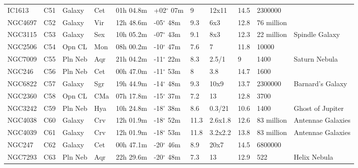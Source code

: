 \documentclass[10pt,twoside,a4paper,english]{article}
\begin{document}
\begin{longtable}{@{}lllllllllll@{}}
IC1613     & C51           & Galaxy  & Cet & 01h 04.8m & +02$^{\circ}$ 07m & 9    & 12x11          & 14.5 & 2300000       &                                 \\ 
NGC4697    & C52           & Galaxy  & Vir & 12h 48.6m & -05$^{\circ}$ 48m & 9.3  & 6x3            & 12.8 & 76 million    &                                 \\ 
NGC3115    & C53           & Galaxy  & Sex & 10h 05.2m & -07$^{\circ}$ 43m & 9.1  & 8x3            & 12.3 & 22 million    & Spindle Galaxy                  \\ 
NGC2506    & C54           & Opn CL  & Mon & 08h 00.2m & -10$^{\circ}$ 47m & 7.6  & 7              & 11.8 & 10000         &                                 \\ 
NGC7009    & C55           & Pln Neb & Aqr & 21h 04.2m & -11$^{\circ}$ 22m & 8.3  & 2.5/1          & 9    & 1400          & Saturn Nebula                   \\ 
NGC246     & C56           & Pln Neb & Cet & 00h 47.0m & -11$^{\circ}$ 53m & 8    & 3.8            & 14.7 & 1600          &                                 \\ 
NGC6822    & C57           & Galaxy  & Sgr & 19h 44.9m & -14$^{\circ}$ 48m & 9.3  & 10x9           & 13.7 & 2300000       & Barnard's Galaxy                \\ 
NGC2360    & C58           & Opn CL  & CMa & 07h 17.8m & -15$^{\circ}$ 37m & 7.2  & 13             & 12.8 & 3700          &                                 \\ 
NGC3242    & C59           & Pln Neb & Hya & 10h 24.8m & -18$^{\circ}$ 38m & 8.6  & 0.3/21         & 10.6 & 1400          & Ghost of Jupiter                \\ 
NGC4038    & C60           & Galaxy  & Crv & 12h 01.9m & -18$^{\circ}$ 52m & 11.3 & 2.6x1.8        & 12.6 & 83 million    & Antennae Galaxies               \\ 
NGC4039    & C61           & Galaxy  & Crv & 12h 01.9m & -18$^{\circ}$ 53m & 11.8 & 3.2x2.2        & 13.8 & 83 million    & Antennae Galaxies               \\ 
NGC247     & C62           & Galaxy  & Cet & 00h 47.1m & -20$^{\circ}$ 46m & 8.9  & 20x7           & 14.5 & 6800000       &                                 \\ 
NGC7293    & C63           & Pln Neb & Aqr & 22h 29.6m & -20$^{\circ}$ 48m & 7.3  & 13             & 12.9 & 522           & Helix Nebula                    \\ 

\end{longtable}
\end{document}
